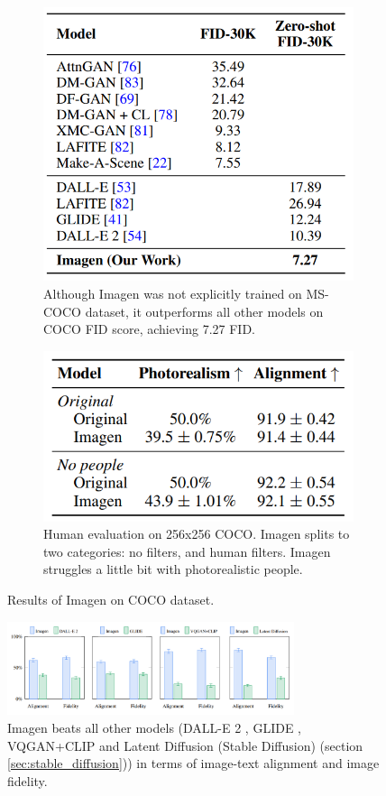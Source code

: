 \begin{figure}[t!]
    \centering
    \begin{subfigure}{0.4\textwidth}
        \centering
        \includegraphics[width=0.6\linewidth]{images/imagen/imagen_coco_zeroshot.png}
        \caption{Although Imagen was not explicitly trained on MS-COCO dataset, it outperforms all other models on COCO FID score, achieving 7.27 FID.}
        \label{fig:imagen_coco_zeroshot}
    \end{subfigure}
    \begin{subfigure}{0.4\textwidth}
        \centering
        \includegraphics[width=0.6\linewidth]{images/imagen/imagen_coco_human_eval.png}
        \caption{Human evaluation on 256x256 COCO. Imagen splits to two categories: no filters, and human filters. Imagen struggles a little bit with photorealistic people.}
        \label{fig:imagen_coco_human_eval}
    \end{subfigure}
    \caption{Results of Imagen on COCO dataset.}
\end{figure}

\begin{figure}
    \centering
    \includegraphics[width=0.75\textwidth]{images/imagen/alignment_fidelity_imagen_vs_models.png}
    \caption{Imagen beats all other models (DALL-E 2 \cite{dalle_2}, GLIDE \cite{glide}, VQGAN+CLIP \cite{vqgan_clip} and Latent Diffusion (Stable Diffusion) \cite{stable_diffusion} (section \ref{sec:stable_diffusion})) in terms of image-text alignment and image fidelity.}
    \label{fig:imagen_alignment_fidelity_vs_other_models}
\end{figure}

